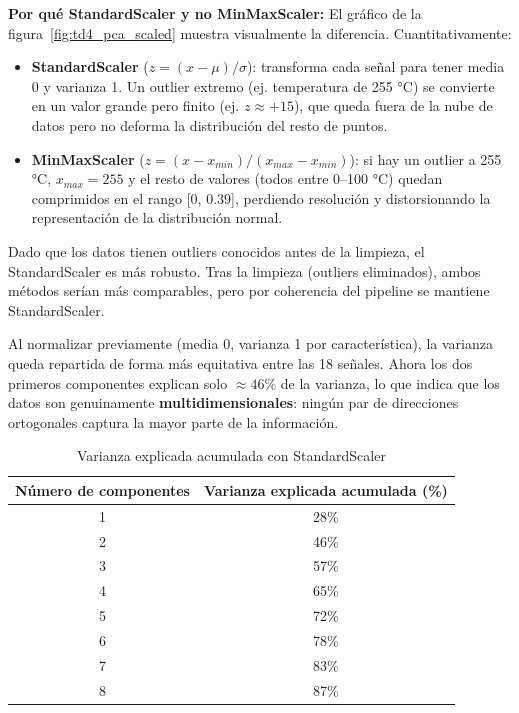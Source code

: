 \documentclass[12pt,a4paper]{article}
\begin{document}
\begin{whybox}
\textbf{Por qué StandardScaler y no MinMaxScaler:}
El gráfico de la figura~\ref{fig:td4_pca_scaled} muestra visualmente la diferencia.
Cuantitativamente:

\begin{itemize}[leftmargin=1.5em]
  \item \textbf{StandardScaler} ($z = (x-\mu)/\sigma$): transforma cada señal para
    tener media 0 y varianza 1. Un outlier extremo (ej. temperatura de 255 °C)
    se convierte en un valor grande pero finito (ej. $z \approx +15$), que queda
    fuera de la nube de datos pero no deforma la distribución del resto de puntos.

  \item \textbf{MinMaxScaler} ($z = (x-x_{min})/(x_{max}-x_{min})$): si hay un
    outlier a 255 °C, $x_{max} = 255$ y el resto de valores (todos entre 0--100 °C)
    quedan comprimidos en el rango [0, 0.39], perdiendo resolución y distorsionando
    la representación de la distribución normal.
\end{itemize}

Dado que los datos tienen outliers conocidos antes de la limpieza, el StandardScaler
es más robusto. Tras la limpieza (outliers eliminados), ambos métodos serían
más comparables, pero por coherencia del pipeline se mantiene StandardScaler.
\end{whybox}

Al normalizar previamente (media 0, varianza 1 por característica), la varianza
queda repartida de forma más equitativa entre las 18 señales.
Ahora los dos primeros componentes explican solo \textbf{$\approx 46\%$} de la
varianza, lo que indica que los datos son genuinamente \textbf{multidimensionales}:
ningún par de direcciones ortogonales captura la mayor parte de la información.

\begin{table}[H]
\centering
\caption{Varianza explicada acumulada con StandardScaler}
\begin{tabular}{@{}cc@{}}
\toprule
\textbf{Número de componentes} & \textbf{Varianza explicada acumulada (\%)}\\
\midrule
1  & 28\%\\
2  & 46\%\\
3  & 57\%\\
4  & 65\%\\
5  & 72\%\\
6  & 78\%\\
7  & 83\%\\
8  & 87\%\\
\bottomrule
\end{tabular}
\end{table}
\end{document}
